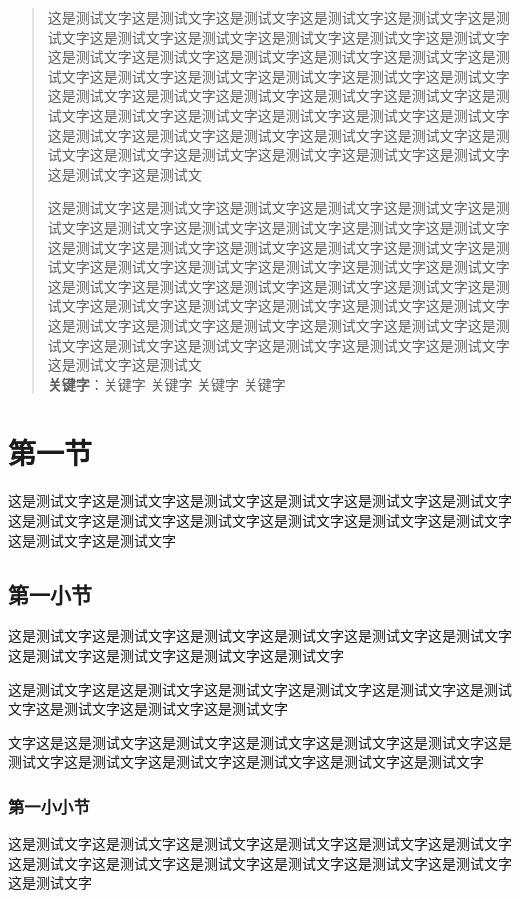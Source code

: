 \documentclass[UTF8]{ctexart}
\begin{document}
 \begin{abstract}
 	\pagestyle{plain}
 	\thispagestyle{empty}
	\par 这是测试文字这是测试文字这是测试文字这是测试文字这是测试文字这是测试文字这是测试文字这是测试文字这是测试文字这是测试文字这是测试文字这是测试文字这是测试文字这是测试文字这是测试文字这是测试文字这是测试文字这是测试文字这是测试文字这是测试文字这是测试文字这是测试文字这是测试文字这是测试文字这是测试文字这是测试文字这是测试文字这是测试文字这是测试文字这是测试文字这是测试文字这是测试文字这是测试文字这是测试文字这是测试文字这是测试文字这是测试文字这是测试文字这是测试文字这是测试文字这是测试文字这是测试文字这是测试文字这是测试文字这是测试文字这是测试文
	\par 这是测试文字这是测试文字这是测试文字这是测试文字这是测试文字这是测试文字这是测试文字这是测试文字这是测试文字这是测试文字这是测试文字这是测试文字这是测试文字这是测试文字这是测试文字这是测试文字这是测试文字这是测试文字这是测试文字这是测试文字这是测试文字这是测试文字这是测试文字这是测试文字这是测试文字这是测试文字这是测试文字这是测试文字这是测试文字这是测试文字这是测试文字这是测试文字这是测试文字这是测试文字这是测试文字这是测试文字这是测试文字这是测试文字这是测试文字这是测试文字这是测试文字这是测试文字这是测试文字这是测试文字这是测试文字这是测试文	
	\\[0.5cm]
	\textbf{关键字}：\quad 关键字 \quad 关键字 \quad 关键字 \quad 关键字
	\newpage
\end{abstract}

\tableofcontents\thispagestyle{empty}
\newpage
\setcounter{page}{1}
\section{第一节}
这是测试文字这是测试文字这是测试文字这是测试文字这是测试文字这是测试文字这是测试文字这是测试文字这是测试文字这是测试文字这是测试文字这是测试文字这是测试文字这是测试文字
\subsection{第一小节}
这是测试文字这是测试文字这是测试文字这是测试文字这是测试文字这是测试文字这是测试文字这是测试文字这是测试文字这是测试文字
\par 这是测试文字这是这是测试文字这是测试文字这是测试文字这是测试文字这是测试文字这是测试文字这是测试文字这是测试文字
\par 文字这是这是测试文字这是测试文字这是测试文字这是测试文字这是测试文字这是测试文字这是测试文字这是测试文字这是测试文字这是测试文字这是测试文字
\subsubsection{第一小小节}
这是测试文字这是测试文字这是测试文字这是测试文字这是测试文字这是测试文字这是测试文字这是测试文字这是测试文字这是测试文字这是测试文字这是测试文字这是测试文字
\end{document}
